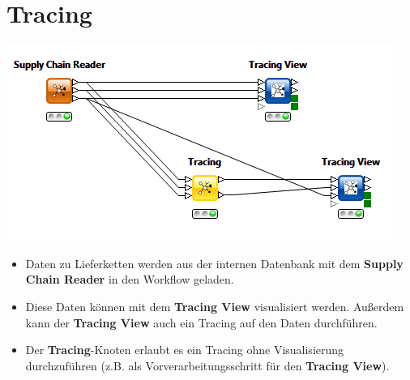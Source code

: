\documentclass{beamer}
\begin{document}
\section{Tracing}
\begin{frame}
	\begin{center}
  		\includegraphics[height=0.4\textheight]{2.png}
	\end{center}
	\begin{itemize}
		\item Daten zu Lieferketten werden aus der internen Datenbank mit dem \textbf{Supply Chain Reader} in den Workflow geladen.
		\item Diese Daten können mit dem \textbf{Tracing View} visualisiert werden. Außerdem kann der \textbf{Tracing View} auch ein Tracing auf den Daten durchführen.
		\item Der \textbf{Tracing}-Knoten erlaubt es ein Tracing ohne Visualisierung durchzuführen (z.B. als Vorverarbeitungsschritt für den \textbf{Tracing View}).
	\end{itemize}
\end{frame}
\end{document}

